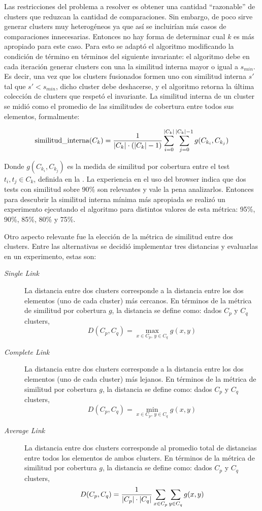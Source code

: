 \par Las restricciones del problema a resolver es obtener una cantidad ``razonable'' de clusters que reduzcan la cantidad de comparaciones. Sin embargo, de poco sirve generar clusters muy heterogéneos ya que así se incluirían más casos de comparaciones innecesarias. Entonces no hay forma de determinar cual $k$ es más apropiado para este caso. Para esto se adaptó el algoritmo modificando la condición de término en términos del siguiente invariante: el algoritmo debe en cada iteración generar clusters con una la similitud interna mayor o igual a $s_{min}$. Es decir, una vez que los clusters fusionados formen uno con similitud interna $s'$ tal que $s' < s_{min}$, dicho cluster debe deshacerse, y el algoritmo retorna la última colección de clusters que respetó el invariante. La similitud interna de un cluster se midió como el promedio de las similitudes de cobertura entre todos sus elementos, formalmente:

\[ \textrm{similitud\_interna}(C_k) = \dfrac{1}{\vert C_k \vert\cdot(\vert C_k \vert-1)} \sum_{i=0}^{\vert C_k \vert} \sum_{j=0}^{\vert C_k \vert - 1} g(C_{k_i},C_{k_j} )\]

\par Donde $g(C_{k_i},C_{k_j})$ es la medida de similitud por cobertura entre el test $t_i, t_j \in C_{k}$, definida en la . La experiencia en el uso del browser indica que dos tests con similitud sobre 90\% son relevantes y vale la pena analizarlos. Entonces para descubrir la similitud interna mínima más apropiada se realizó un experimento ejecutando el algoritmo para distintos valores de esta métrica: 95\%, 90\%, 85\%, 80\% y 75\%. 

\par Otro aspecto relevante fue la elección de la métrica de similitud entre dos clusters. Entre las alternativas se decidió implementar tres distancias y evaluarlas en un experimento, estas son: 
\begin{description}
\item[\emph{Single Link}] La distancia entre dos clusters corresponde a la distancia entre los dos elementos (uno de cada cluster) más cercanos. En términos de la métrica de similitud por cobertura $g$, la distancia se define como: dados $C_p$ y $C_q$ clusters,
\[ D(C_p,C_q) = \max_{x \in C_p,\, y  \in C_q} g(x,y) \]

\item[\emph{Complete Link}] La distancia entre dos clusters corresponde a la distancia entre los dos elementos (uno de cada cluster) más lejanos. En términos de la métrica de similitud por cobertura $g$, la distancia se define como: dados $C_p$ y $C_q$ clusters,
\[ D(C_p,C_q) = \min_{x \in C_p,\, y  \in C_q} g(x,y) \]

\item[\emph{Average Link}] La distancia entre dos clusters corresponde al promedio total de distancias entre todos los elementos de ambos clusters.  En términos de la métrica de similitud por cobertura $g$, la distancia se define como: dados $C_p$ y $C_q$ clusters,
\[ D(C_p,C_q) = \dfrac{1}{\vert C_p \vert\cdot\vert C_q \vert} \sum_{x \in C_p} \sum_{y  \in C_q} g(x,y) \]


\end{description}

